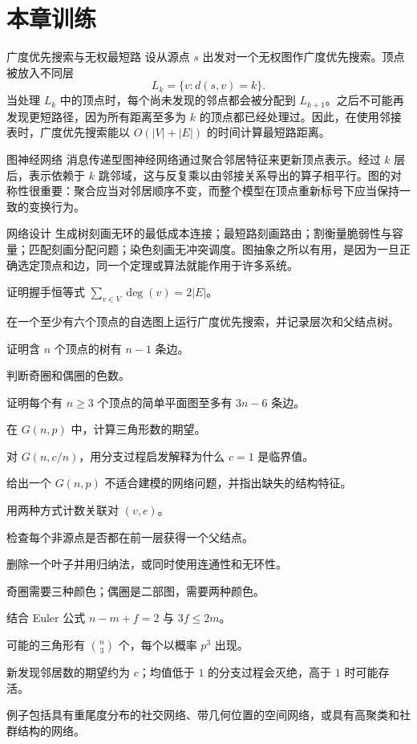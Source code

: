 \section{本章训练}

\begin{workedexample}{广度优先搜索与无权最短路}
设从源点 $s$ 出发对一个无权图作广度优先搜索。顶点被放入不同层
\[
    L_k=\{v:d(s,v)=k\}.
\]
当处理 $L_k$ 中的顶点时，每个尚未发现的邻点都会被分配到 $L_{k+1}$。之后不可能再发现更短路径，因为所有距离至多为 $k$ 的顶点都已经处理过。因此，在使用邻接表时，广度优先搜索能以 $O(|V|+|E|)$ 的时间计算最短路距离。
\end{workedexample}

\begin{applicationbox}{图神经网络}
消息传递型图神经网络通过聚合邻居特征来更新顶点表示。经过 $k$ 层后，表示依赖于 $k$ 跳邻域，这与反复乘以由邻接关系导出的算子相平行。图的对称性很重要：聚合应当对邻居顺序不变，而整个模型在顶点重新标号下应当保持一致的变换行为。
\end{applicationbox}

\begin{applicationbox}{网络设计}
生成树刻画无环的最低成本连接；最短路刻画路由；割衡量脆弱性与容量；匹配刻画分配问题；染色刻画无冲突调度。图抽象之所以有用，是因为一旦正确选定顶点和边，同一个定理或算法就能作用于许多系统。
\end{applicationbox}

\begin{chapterexercises}
    \item 证明握手恒等式 $\sum_{v\in V}\deg(v)=2|E|$。
    \item 在一个至少有六个顶点的自选图上运行广度优先搜索，并记录层次和父结点树。
    \item 证明含 $n$ 个顶点的树有 $n-1$ 条边。
    \item 判断奇圈和偶圈的色数。
    \item 证明每个有 $n\ge3$ 个顶点的简单平面图至多有 $3n-6$ 条边。
    \item 在 $G(n,p)$ 中，计算三角形数的期望。
    \item 对 $G(n,c/n)$，用分支过程启发解释为什么 $c=1$ 是临界值。
    \item 给出一个 $G(n,p)$ 不适合建模的网络问题，并指出缺失的结构特征。
\end{chapterexercises}

\begin{selectedhints}
    \item 用两种方式计数关联对 $(v,e)$。
    \item 检查每个非源点是否都在前一层获得一个父结点。
    \item 删除一个叶子并用归纳法，或同时使用连通性和无环性。
    \item 奇圈需要三种颜色；偶圈是二部图，需要两种颜色。
    \item 结合 Euler 公式 $n-m+f=2$ 与 $3f\le2m$。
    \item 可能的三角形有 $\binom n3$ 个，每个以概率 $p^3$ 出现。
    \item 新发现邻居数的期望约为 $c$；均值低于 $1$ 的分支过程会灭绝，高于 $1$ 时可能存活。
    \item 例子包括具有重尾度分布的社交网络、带几何位置的空间网络，或具有高聚类和社群结构的网络。
\end{selectedhints}
